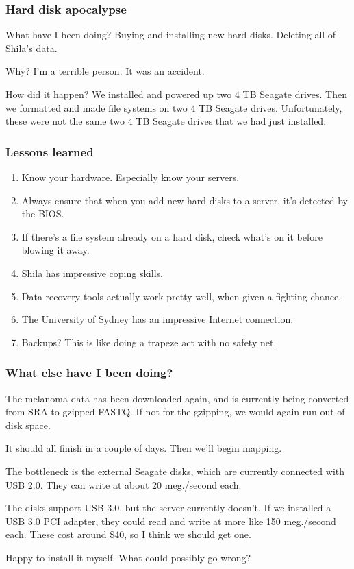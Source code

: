 \documentclass{beamer}
\begin{document}
\begin{frame}
\frametitle{Hard disk apocalypse}
What have I been doing? Buying and installing new hard disks. Deleting all of Shila's data.

Why? \st{I'm a terrible person. }It was an accident.

How did it happen? We installed and powered up two 4 TB Seagate drives. Then we formatted and made file systems on two 4 TB Seagate drives. Unfortunately, these were not the same two 4 TB Seagate drives that we had just installed.
\end{frame}

\begin{frame}
\frametitle{Lessons learned}
\begin{enumerate}
\item Know your hardware. Especially know your servers.
\item Always ensure that when you add new hard disks to a server, it's detected by the BIOS.
\item If there's a file system already on a hard disk, check what's on it before blowing it away.
\item Shila has impressive coping skills.
\item Data recovery tools actually work pretty well, when given a fighting chance.
\item The University of Sydney has an impressive Internet connection.
\item Backups? This is like doing a trapeze act with no safety net.
\end{enumerate}
\end{frame}

\begin{frame}
\frametitle{What else have I been doing?}
The melanoma data has been downloaded again, and is currently being converted from SRA to
gzipped FASTQ. If not for the gzipping, we would again run out of disk space.

It should all finish in a couple of days. Then we'll begin mapping.

The bottleneck is the external Seagate disks, which are currently connected with USB 2.0. 
They can write at about 20 meg./second each.

The disks support USB 3.0, but the server currently doesn't. If we installed a USB 3.0 PCI 
adapter, they could read and write at more like 150 meg./second each. These cost around 
\$40, so I think we should get one.

Happy to install it myself. What could possibly go wrong?
\end{frame}
\end{document}

